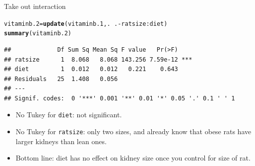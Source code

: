 \documentclass[unknownkeysallowed]{beamer}\usepackage[]{graphicx}\usepackage[]{color}
\makeatletter
\newcommand{\hlopt}[1]{\textcolor[rgb]{0,0,0}{#1}}%
\newcommand{\hlstd}[1]{\textcolor[rgb]{0.345,0.345,0.345}{#1}}%
\newcommand{\hlkwb}[1]{\textcolor[rgb]{0.69,0.353,0.396}{#1}}%
\newcommand{\hlkwd}[1]{\textcolor[rgb]{0.737,0.353,0.396}{\textbf{#1}}}%
\newenvironment{kframe}{%
 \def\at@end@of@kframe{}%
 \ifinner\ifhmode%
  \def\at@end@of@kframe{\end{minipage}}%
  \begin{minipage}{\columnwidth}%
 \fi\fi%
 \def\FrameCommand##1{\hskip\@totalleftmargin \hskip-\fboxsep
 \colorbox{shadecolor}{##1}\hskip-\fboxsep
     \hskip-\linewidth \hskip-\@totalleftmargin \hskip\columnwidth}%
 \MakeFramed {\advance\hsize-\width
   \@totalleftmargin\z@ \linewidth\hsize
   \@setminipage}}%
 {\par\unskip\endMakeFramed%
 \at@end@of@kframe}
\newenvironment{knitrout}{}{} %
\makeatother
\begin{document}
\begin{frame}[fragile]{Take out interaction}
  
\begin{knitrout}\small
{}\color{fgcolor}\begin{kframe}
\begin{alltt}
\hlstd{vitaminb.2}\hlkwb{=}\hlkwd{update}\hlstd{(vitaminb.1,.}\hlopt{~}\hlstd{.}\hlopt{-}\hlstd{ratsize}\hlopt{:}\hlstd{diet)}
\hlkwd{summary}\hlstd{(vitaminb.2)}
\end{alltt}
\begin{verbatim}
##             Df Sum Sq Mean Sq F value   Pr(>F)    
## ratsize      1  8.068   8.068 143.256 7.59e-12 ***
## diet         1  0.012   0.012   0.221    0.643    
## Residuals   25  1.408   0.056                     
## ---
## Signif. codes:  0 '***' 0.001 '**' 0.01 '*' 0.05 '.' 0.1 ' ' 1
\end{verbatim}
\end{kframe}
\end{knitrout}

\begin{itemize}
\item No Tukey for \texttt{diet}: not significant.
\item No Tukey for \texttt{ratsize}: only two sizes, and already know
  that obese rats have larger kidneys than lean ones.
\item Bottom line: diet has no effect on kidney size once you control
  for size of rat.
\end{itemize}
  
\end{frame}
\end{document}
